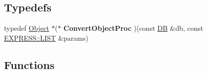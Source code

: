 \subsection*{Typedefs}
\begin{DoxyCompactItemize}
\item 
\hypertarget{namespace_assimp_1_1_s_t_e_p_a4d68da11578b70197d0296e587dca96d}{typedef \hyperlink{class_assimp_1_1_s_t_e_p_1_1_object}{Object} $\ast$($\ast$ {\bfseries Convert\+Object\+Proc} )(const \hyperlink{class_assimp_1_1_s_t_e_p_1_1_d_b}{D\+B} \&db, const \hyperlink{class_assimp_1_1_s_t_e_p_1_1_e_x_p_r_e_s_s_1_1_l_i_s_t}{E\+X\+P\+R\+E\+S\+S\+::\+L\+I\+S\+T} \&params)}\label{namespace_assimp_1_1_s_t_e_p_a4d68da11578b70197d0296e587dca96d}

\end{DoxyCompactItemize}
\subsection*{Functions}
